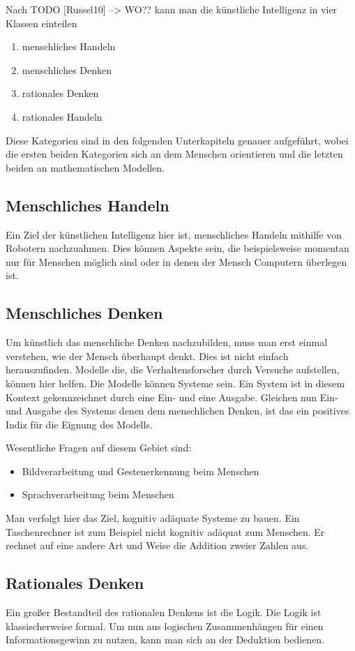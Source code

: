 Nach TODO [Russel10] --> WO?? kann man die künstliche Intelligenz in vier Klassen einteilen
\begin{enumerate}
\item menschliches Handeln
\item menschliches Denken
\item rationales Denken
\item rationales Handeln
\end{enumerate}
Diese Kategorien sind in den folgenden Unterkapiteln genauer aufgeführt, wobei die ersten beiden Kategorien sich an dem Menschen orientieren und die letzten beiden an mathematischen Modellen. 

\subsection{Menschliches Handeln}
Ein Ziel der künstlichen Intelligenz hier ist, menschliches Handeln mithilfe von Robotern nachzuahmen. Dies können Aspekte sein, die beispielsweise momentan nur für Menschen möglich sind oder in denen der Mensch Computern überlegen ist.    

\subsection{Menschliches Denken}
Um künstlich das menschliche Denken nachzubilden, muss  man erst einmal verstehen, wie der Mensch überhaupt denkt. Dies ist nicht einfach herauszufinden. Modelle die, die Verhaltensforscher durch Versuche aufstellen,  können hier helfen. Die Modelle können Systeme sein. Ein System ist in diesem Kontext gekennzeichnet durch eine Ein- und eine Ausgabe. Gleichen nun Ein- und Ausgabe des Systems denen dem menschlichen Denken, ist das ein positives Indiz für die Eignung des Modells.

Wesentliche Fragen auf diesem Gebiet sind:
\begin{itemize}
\item Bildverarbeitung und Gestenerkennung beim Menschen
\item Sprachverarbeitung beim Menschen
\end{itemize}    

Man verfolgt hier das Ziel, kognitiv adäquate Systeme zu bauen. Ein Taschenrechner ist zum Beispiel nicht kognitiv adäquat zum Menschen. Er rechnet auf eine andere Art und Weise die Addition zweier Zahlen aus.
\subsection{Rationales Denken}
Ein großer Bestandteil des rationalen Denkens ist die Logik. Die Logik ist klassischerweise formal. Um nun aus logischen Zusammenhängen für einen Informationsgewinn zu nutzen, kann man sich an der Deduktion bedienen. 

